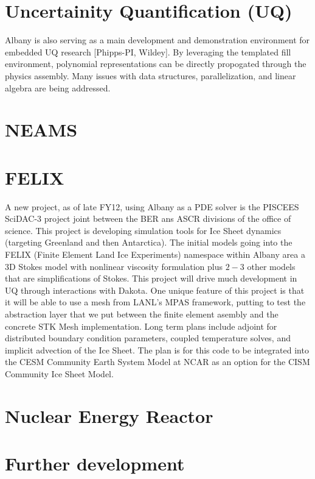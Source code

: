 \documentclass[pdf,12pt,report,strict]{SANDreport}
\theoremstyle{remark}
\begin{document}
\section {Uncertainity Quantification (UQ)}
Albany is also serving as a main development and demonstration
environment for embedded UQ research [Phipps-PI, Wildey]. By
leveraging the templated fill environment, polynomial representations
can be directly propogated through the physics assembly. Many issues
with data structures, parallelization, and linear algebra are being
addressed.  

\section{NEAMS}

\section{FELIX}
A new project, as of late FY12, using Albany as a PDE solver is the PISCEES SciDAC-3 project
joint between the BER ans ASCR divisions of the office of science. This
project is developing simulation tools for Ice Sheet dynamics (targeting
Greenland and then Antarctica). The initial models going into the FELIX
(Finite Element Land Ice Experiments) namespace within Albany area
a 3D Stokes model with nonlinear viscosity
formulation plus $2-3$ other models that are simplifications of Stokes.
This project will drive much development in UQ through interactions 
with Dakota. One unique feature of this project is that it will be able
to use a mesh from LANL's MPAS framework, putting to test the abstraction
layer that we put between the finite element asembly and the concrete
STK Mesh implementation. Long term plans include adjoint for distributed
boundary condition parameters, coupled temperature solves, and implicit
advection of the Ice Sheet. The plan is for this code to be integrated
into the CESM Community Earth System Model at NCAR as an option for the
CISM Community Ice Sheet Model.

\section{Nuclear Energy Reactor}

\section{Further development}
\end{document}
